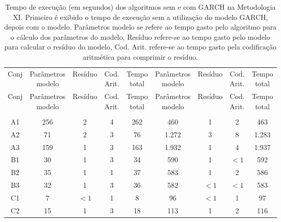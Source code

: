 \begin{center}
\begin{longtable}{ccccc|cccc}
\toprule
\rowcolor{white}
\caption[Metodologia XI: tempo de execução]{Tempo de execução (em segundos)
dos algoritmos sem e com GARCH na Metodologia XI. Primeiro é exibido o tempo de
execução sem a utilização do modelo GARCH, depois com o modelo. Parâmetros
modelo se refere ao tempo gasto pelo algoritmo para o cálculo dos parâmetros do
modelo, Resíduo refere-se ao tempo gasto pelo modelo para calcular o resíduo do
modelo, Cod. Arit. refere-se ao tempo gasto pela codificação aritmética para
comprimir o resíduo.} \label{tab:EvolucaoEntropiaMet11}\\
\midrule
Conj & \specialcell{Parâmetros\\modelo} &
Resíduo & \specialcell{Cod.\\Arit.} & \specialcell{Tempo\\total} &
\specialcell{Parâmetros\\modelo} &
Resíduo & \specialcell{Cod.\\Arit.} & \specialcell{Tempo\\total} \\
\midrule
\endfirsthead 
\midrule
\rowcolor{white}
Conj & \specialcell{Parâmetros\\modelo} &
Resíduo & \specialcell{Cod.\\Arit.} & \specialcell{Tempo\\total} &
\specialcell{Parâmetros\\modelo} &
Resíduo & \specialcell{Cod.\\Arit.} & \specialcell{Tempo\\total} \\
\toprule
\endhead
\midrule \\ %
\endfoot
\bottomrule 
\endlastfoot
A1&256&2&4&262&460&1&2&463\\
A2&71&2&3&76&1.272&3&8&1.283\\
A3&159&1&3&163&1.932&1&4&1.937\\
B1&30&1&3&34&590&1&$<1$&592\\
B2&35&1&1&37&583&1&2&586\\
B3&32&1&3&36&582&$<1$&$<1$&583\\
C1&7&$<1$&1&8&96&$<1$&1&97\\
C2&15&1&3&18&113&1&2&116\\

\end{longtable}
\end{center}
